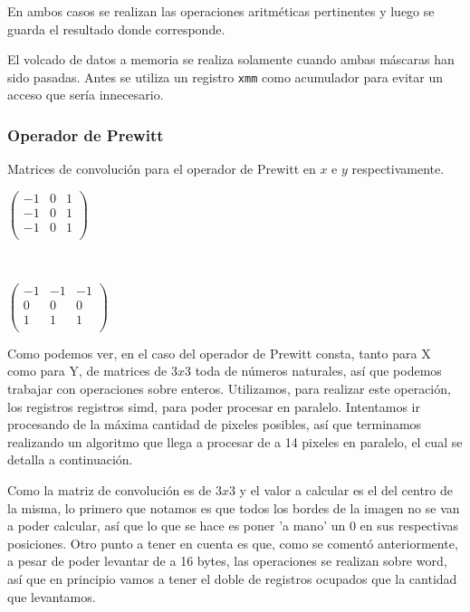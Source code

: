 En ambos casos se realizan las operaciones aritméticas pertinentes y luego se guarda el resultado donde corresponde. 

El volcado de datos a memoria se realiza solamente cuando ambas máscaras han sido pasadas. Antes se utiliza un registro \texttt{xmm} como acumulador para evitar un acceso que sería innecesario.







\subsubsection{Operador de Prewitt}

Matrices de convolución para el operador de Prewitt en $x$ e $y$ respectivamente.

\begin{center}
\begin{minipage}{0.30 \textwidth}
$\begin{pmatrix}
-1 & 0 & 1 \\
-1 & 0 & 1 \\
-1 & 0 & 1 \\
\end{pmatrix}$
\end{minipage}
\ \ 
 \begin{minipage}{0.30 \textwidth}
$\begin{pmatrix}
-1 & -1 & -1 \\
0 & 0 & 0  \\
1 & 1 & 1 \\
\end{pmatrix}$
\end{minipage}
\end{center}

Como podemos ver, en el caso del operador de Prewitt consta, tanto para X como para Y, de matrices de $3x3$ toda de números naturales, así que podemos trabajar con operaciones sobre enteros. Utilizamos, para realizar este operación, los registros registros simd, para poder procesar en paralelo. Intentamos ir procesando de la máxima cantidad de pixeles posibles, así que terminamos realizando un algoritmo que llega a procesar de a 14 pixeles en paralelo, el cual se detalla a continuación.

Como la matriz de convolución es de $3x3$ y el valor a calcular es el del centro de la misma, lo primero que notamos es que todos los bordes de la imagen no se van a poder calcular, así que lo que se hace es poner 'a mano' un 0 en sus respectivas posiciones. Otro punto a tener en cuenta es que, como se comentó anteriormente, a pesar de poder levantar de a 16 bytes, las operaciones se realizan sobre word, así que en principio vamos a tener el doble de registros ocupados que la cantidad que levantamos.

